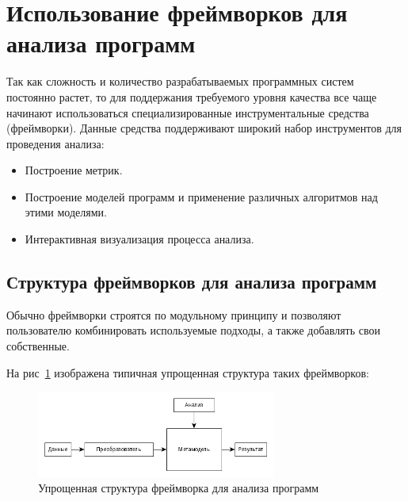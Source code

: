 \section{Использование фреймворков для анализа программ} %

Так как сложность и количество разрабатываемых программных систем постоянно
растет, то для поддержания требуемого уровня качества все чаще начинают
использоваться специализированные инструментальные средства (фреймворки). Данные
средства поддерживают широкий набор инструментов для проведения анализа:

\begin{itemize}
    \item Построение метрик.
    \item Построение моделей программ и применение различных алгоритмов над
    этими моделями.
    \item Интерактивная визуализация процесса анализа.
\end{itemize}

\subsection{Структура фреймворков для анализа программ} %

Обычно фреймворки строятся по модульному принципу и позволяют пользователю
комбинировать используемые подходы, а также добавлять свои собственные.

На рис~\ref{fig:framework_structure} изображена типичная упрощенная структура
таких фреймворков:

\begin{figure}[h!]
    \begin{center}
        \includegraphics[width=0.7\textwidth]{img/framework_structure.png}
    \end{center}
    \caption{Упрощенная структура фреймворка для анализа программ}
    \label{fig:framework_structure}
\end{figure}

